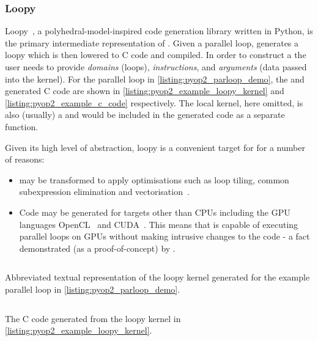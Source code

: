 \documentclass[thesis]{subfiles}
\begin{document}
\subsubsection{Loopy}

Loopy~\cite{klocknerLooPyTransformationbased2014}, a polyhedral-model-inspired code generation library written in Python, is the primary intermediate representation of .
Given a parallel loop,  generates a loopy  which is then lowered to C code and compiled.
In order to construct a  the user needs to provide \emph{domains} (loops), \emph{instructions}, and \emph{arguments} (data passed into the kernel).
For the parallel loop in \cref{listing:pyop2_parloop_demo}, the  and generated C code are shown in \cref{listing:pyop2_example_loopy_kernel} and \cref{listing:pyop2_example_c_code} respectively.
The local kernel, here omitted, is also (usually) a  and would be included in the generated code as a separate function.

Given its high level of abstraction, loopy is a convenient target for  for a number of reasons:
\begin{itemize}
  \item
     may be transformed to apply optimisations such as loop tiling, common subexpression elimination and vectorisation~\cite{sunStudyVectorizationMatrixfree2020}.
  \item
    Code may be generated for targets other than CPUs including the GPU languages OpenCL~\cite{stoneOpenCLParallelProgramming2010} and CUDA~\cite{CUDAProgrammingGuide}.
    This means that  is capable of executing parallel loops on GPUs without making intrusive changes to the code - a fact demonstrated (as a proof-of-concept) by \cite{fenics2021-kulkarni}.
\end{itemize}

\begin{listing}
  \centering
  \begin{minipage}{.9\textwidth}
    \inputminted[linenos]{text}{./scripts/artefacts/pyop2_example_loopy_kernel_tidy.txt}
  \end{minipage}
  \caption{
    Abbreviated textual representation of the loopy kernel generated for the example parallel loop in \cref{listing:pyop2_parloop_demo}.
  }
  \label{listing:pyop2_example_loopy_kernel}
\end{listing}

\begin{listing}
  \centering
  \begin{minipage}{.9\textwidth}
    \inputminted[linenos]{c}{./scripts/artefacts/pyop2_example_c_code_tidy.c}
  \end{minipage}
  \caption{
    The C code generated from the loopy kernel in \cref{listing:pyop2_example_loopy_kernel}.
  }
  \label{listing:pyop2_example_c_code}
\end{listing}
\end{document}
